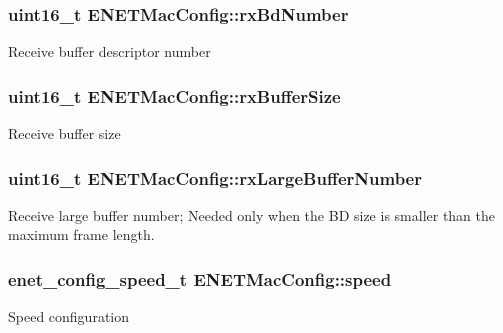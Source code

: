 \subsubsection[{\texorpdfstring{rx\+Bd\+Number}{rxBdNumber}}]{\setlength{\rightskip}{0pt plus 5cm}uint16\+\_\+t E\+N\+E\+T\+Mac\+Config\+::rx\+Bd\+Number}\hypertarget{structENETMacConfig_a5241b693ec7b7ad33815586abf75484b}{}\label{structENETMacConfig_a5241b693ec7b7ad33815586abf75484b}
Receive buffer descriptor number 
\subsubsection[{\texorpdfstring{rx\+Buffer\+Size}{rxBufferSize}}]{\setlength{\rightskip}{0pt plus 5cm}uint16\+\_\+t E\+N\+E\+T\+Mac\+Config\+::rx\+Buffer\+Size}\hypertarget{structENETMacConfig_a16dcf40e2aedc73164a3340d4c53fd12}{}\label{structENETMacConfig_a16dcf40e2aedc73164a3340d4c53fd12}
Receive buffer size 
\subsubsection[{\texorpdfstring{rx\+Large\+Buffer\+Number}{rxLargeBufferNumber}}]{\setlength{\rightskip}{0pt plus 5cm}uint16\+\_\+t E\+N\+E\+T\+Mac\+Config\+::rx\+Large\+Buffer\+Number}\hypertarget{structENETMacConfig_a678df9b8b404e7aaf15d6297e7bc548c}{}\label{structENETMacConfig_a678df9b8b404e7aaf15d6297e7bc548c}
Receive large buffer number; Needed only when the BD size is smaller than the maximum frame length. 
\subsubsection[{\texorpdfstring{speed}{speed}}]{\setlength{\rightskip}{0pt plus 5cm}enet\+\_\+config\+\_\+speed\+\_\+t E\+N\+E\+T\+Mac\+Config\+::speed}\hypertarget{structENETMacConfig_a5d76349c96516955ed7e57440bf72a8d}{}\label{structENETMacConfig_a5d76349c96516955ed7e57440bf72a8d}
Speed configuration 
